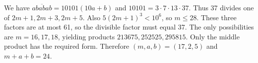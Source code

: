 We have $\overline{ababab}=10101(10a+b)$ and $10101=3\cdot7\cdot13\cdot37$. Thus 37 divides one of $2m+1,2m+3,2m+5$. Also $5(2m+1)^3<10^6$, so $m\le28$. These three factors are at most 61, so the divisible factor must equal 37. The only possibilities are $m=16,17,18$, yielding products $213675,252525,295815$. Only the middle product has the required form. Therefore $(m,a,b)=(17,2,5)$ and $m+a+b=\boxed{24}$.
